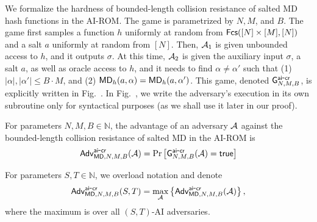   We formalize the hardness of bounded-length collision resistance of salted MD hash functions in the AI-ROM. %
The game is parametrized by $N, M$, and $B$. 
The game first samples a function $h$ uniformly at random from $\mathsf{Fcs}([N]\times [M],[N])$ and a salt $a$ uniformly at random from $[N]$. Then, $\mathcal{A}_1$ is given unbounded access to $h$, and it outputs $\sigma$. At this time, $\mathcal{A}_2$ is given the auxiliary input $\sigma$, a salt $a$, as well as  oracle access to $h$, and it needs to find $\alpha\neq \alpha'$ such that (1) $|\alpha|,|\alpha'| \le B\cdot M$, and (2) $\mathsf{MD}_h(a,\alpha)=\mathsf{MD}_h(a,\alpha')$. This game, denoted $\mathsf{G}^{{\mathsf{ai}\mbox{-}\mathsf{cr}}}_{N,M,B}$, is explicitly written in Fig.~. In Fig.~, we write the adversary's execution in its own subroutine only for syntactical purposes (as we shall use it later in our proof).

\begin{definition}[AI-CR Advantage]
For parameters $N,M,B\in \mathbb N$, the advantage of an adversary $\mathcal{A}$ against the bounded-length collision resistance of salted MD in the AI-ROM is
\begin{align*}
\mathsf{Adv}_{\mathsf{MD},N,M,B}^{{\mathsf{ai}\mbox{-}\mathsf{cr}}}(\mathcal{A})=\Pr\left[\mathsf{G}^{{\mathsf{ai}\mbox{-}\mathsf{cr}}}_{N,M,B}(\mathcal{A}) = \mathsf{true} \right]
\end{align*}

\noindent For parameters $S,T\in\mathbb N$, we overload notation and denote 
\begin{align*}
\mathsf{Adv}^{{\mathsf{ai}\mbox{-}\mathsf{cr}}}_{\mathsf{MD},N,M,B}(S,T) = \max_{\mathcal{A}}\left\{\mathsf{Adv}^{{\mathsf{ai}\mbox{-}\mathsf{cr}}}_{\mathsf{MD},N,M,B}(\mathcal{A})\right\},
\end{align*}
where the maximum is over all $(S,T)$-AI adversaries.
\end{definition}




